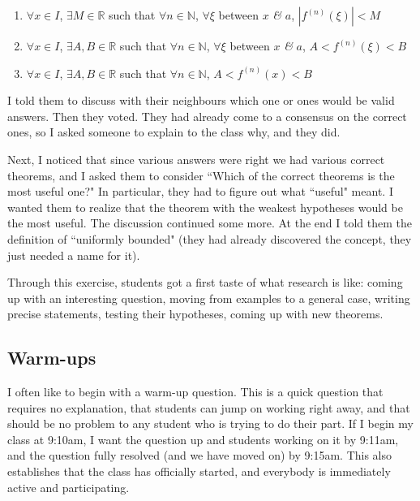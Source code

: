 \documentclass[11pt]{article}
\begin{document}
\begin{example}
\begin{comments}
\begin{enumerate}
				\item ${\displaystyle  \forall x \in I}$, $\exists M \in \mathbb{R}$
					such that $\forall n \in \mathbb{N}$, $\forall \xi$ between $x$ \emph{\&}
					$a$, $| f^{(n)}(\xi)| < M$

				\item ${\displaystyle  \forall x \in I}$, $\exists A, B \in \mathbb{R}$
					such that $\forall n \in \mathbb{N}$, $\forall \xi$ between $x$ \emph{\&}
					$a$, $A < f^{(n)}(\xi) < B$

				\item ${\displaystyle  \forall x \in I}$, $\exists A, B \in \mathbb{R}$
					such that $\forall n \in \mathbb{N}$, $A < f^{(n)}(x) < B$
			\end{enumerate}
			I told them to discuss with their neighbours which one or ones would be valid
			answers. Then they voted. They had already come to a consensus on the correct
			ones, so I asked someone to explain to the class why, and they did.

			Next, I noticed that since various answers were right we had various
			correct theorems, and I asked them to consider ``Which of the correct theorems
			is the most useful one?" In particular, they had to figure out what ``useful"
			meant. I wanted them to realize that the theorem with the weakest
			hypotheses would be the most useful. The discussion continued some more.
			At the end I told them the definition of ``uniformly bounded" (they had
			already discovered the concept, they just needed a name for it).

			Through this exercise, students got a first taste of what research is like:
			coming up with an interesting question, moving from examples to a general case,
			writing precise statements, testing their hypotheses, coming up with new
			theorems.
		\end{comments}
	\end{example}

	\newpage

	\subsection{Warm-ups}

	I often like to begin with a warm-up question. This is a quick question that requires
	no explanation, that students can jump on working right away, and that should be
	no problem to any student who is trying to do their part. If I begin my class
	at 9:10am, I want the question up and students working on it by 9:11am, and
	the question fully resolved (and we have moved on) by 9:15am. This also establishes
	that the class has officially started, and everybody is immediately active and
	participating.\\
\end{document}
